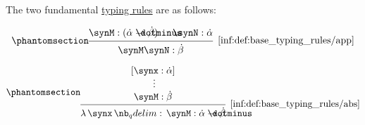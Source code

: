 \begin{definition}\label{def:base_typing_rules}
  The two fundamental \hyperref[def:type_derivation_tree]{typing rules} are as follows:
  \begin{paracol}{2}
    \begin{leftcolumn}
      \begin{equation*}\taglabel[\ensuremath{ \logic{App} }]{inf:def:base_typing_rules/app}
        \begin{prooftree}
          \hypo{ \synM: (\syn\alpha \synimplies \syn\beta) }
          \hypo{ \synN: \syn\alpha }
          \infer2[\ref{inf:def:base_typing_rules/app}]{ \synM \synN: \syn\beta }
        \end{prooftree}
      \end{equation*}
    \end{leftcolumn}

    \begin{rightcolumn}
      \begin{equation*}\taglabel[\ensuremath{ \logic{Abs} }]{inf:def:base_typing_rules/abs}
        \begin{prooftree}
          \hypo{ [\synx: \syn\alpha] }
          \ellipsis {} { \synM: \syn\beta }
          \infer1[\ref{inf:def:base_typing_rules/abs}]{ \qabs \synx \synM: \syn\alpha \synimplies \syn\beta }
        \end{prooftree}
      \end{equation*}
    \end{rightcolumn}
  \end{paracol}
\end{definition}

